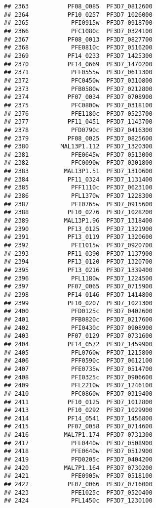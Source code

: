 \documentclass{article}\usepackage[]{graphicx}\usepackage[]{color}
\makeatletter
\newenvironment{kframe}{%
 \def\at@end@of@kframe{}%
 \ifinner\ifhmode%
  \def\at@end@of@kframe{\end{minipage}}%
  \begin{minipage}{\columnwidth}%
 \fi\fi%
 \def\FrameCommand##1{\hskip\@totalleftmargin \hskip-\fboxsep
 \colorbox{shadecolor}{##1}\hskip-\fboxsep
     \hskip-\linewidth \hskip-\@totalleftmargin \hskip\columnwidth}%
 \MakeFramed {\advance\hsize-\width
   \@totalleftmargin\z@ \linewidth\hsize
   \@setminipage}}%
 {\par\unskip\endMakeFramed%
 \at@end@of@kframe}
\newenvironment{knitrout}{}{} %
\makeatother
\begin{document}
\begin{knitrout}
\begin{kframe}
\begin{verbatim}
## 2363           PF08_0085  PF3D7_0812600
## 2364           PF10_0257  PF3D7_1026000
## 2365            PFI0915w  PF3D7_0918700
## 2366            PFC1080c  PF3D7_0324100
## 2367           PF08_0013  PF3D7_0827700
## 2368            PFE0810c  PF3D7_0516200
## 2369           PF14_0233  PF3D7_1425300
## 2370           PF14_0669  PF3D7_1470200
## 2371            PFF0555w  PF3D7_0611300
## 2372            PFC0450w  PF3D7_0310800
## 2373            PFB0580w  PF3D7_0212800
## 2374           PF07_0034  PF3D7_0708900
## 2375            PFC0800w  PF3D7_0318100
## 2376            PFE1180c  PF3D7_0523700
## 2377           PF11_0451  PF3D7_1143700
## 2378            PFD0790c  PF3D7_0416300
## 2379           PF08_0025  PF3D7_0825600
## 2380         MAL13P1.112  PF3D7_1320300
## 2381            PFE0645w  PF3D7_0513000
## 2382            PFC0090w  PF3D7_0301800
## 2383          MAL13P1.51  PF3D7_1310600
## 2384           PF11_0324  PF3D7_1131400
## 2385            PFF1110c  PF3D7_0623100
## 2386            PFL1370w  PF3D7_1228300
## 2387            PFI0765w  PF3D7_0915600
## 2388           PF10_0276  PF3D7_1028200
## 2389          MAL13P1.96  PF3D7_1318400
## 2390           PF13_0125  PF3D7_1321900
## 2391           PF13_0119  PF3D7_1320600
## 2392            PFI1015w  PF3D7_0920700
## 2393           PF11_0390  PF3D7_1137900
## 2394           PF13_0120  PF3D7_1320700
## 2395           PF13_0216  PF3D7_1339400
## 2396            PFL1180w  PF3D7_1224500
## 2397           PF07_0065  PF3D7_0715900
## 2398           PF14_0146  PF3D7_1414800
## 2399           PF10_0207  PF3D7_1021300
## 2400            PFD0125c  PF3D7_0402600
## 2401            PFB0820c  PF3D7_0217600
## 2402            PFI0430c  PF3D7_0908900
## 2403           PF07_0129  PF3D7_0731600
## 2404           PF14_0572  PF3D7_1459900
## 2405            PFL0760w  PF3D7_1215800
## 2406            PFF0590c  PF3D7_0612100
## 2407            PFE0735w  PF3D7_0514700
## 2408            PFI0325c  PF3D7_0906600
## 2409            PFL2210w  PF3D7_1246100
## 2410            PFC0860w  PF3D7_0319400
## 2411           PF10_0125  PF3D7_1012800
## 2413           PF10_0292  PF3D7_1029900
## 2414           PF14_0541  PF3D7_1456800
## 2415           PF07_0058  PF3D7_0714600
## 2416          MAL7P1.174  PF3D7_0731300
## 2417            PFE0440w  PF3D7_0508900
## 2418            PFE0640w  PF3D7_0512900
## 2419            PFD0205c  PF3D7_0404200
## 2420          MAL7P1.164  PF3D7_0730200
## 2421            PFE0905w  PF3D7_0518100
## 2422           PF07_0066  PF3D7_0716000
## 2423            PFE1025c  PF3D7_0520400
## 2424            PFL1450c  PF3D7_1230100

\end{verbatim}
\end{kframe}
\end{knitrout}
\end{document}
